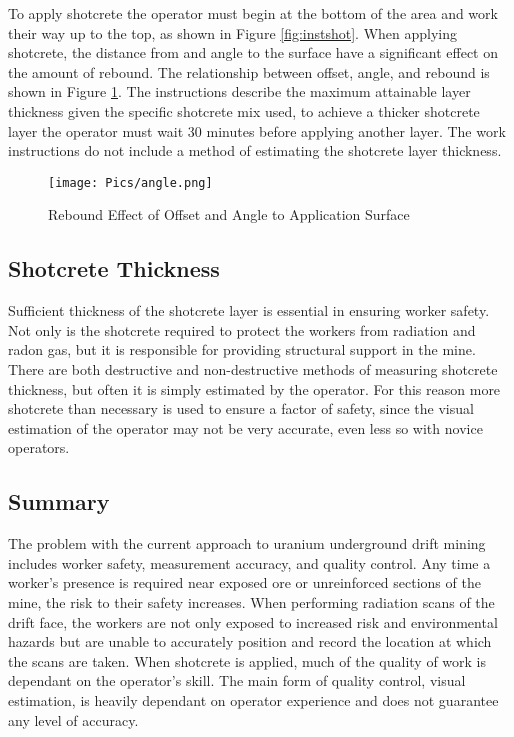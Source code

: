 To apply shotcrete the operator must begin at the bottom of the area and work their way up to the top, as shown in Figure \ref{fig:instshot}. When applying shotcrete, the distance from and angle to the surface have a significant effect on the amount of rebound. The relationship between offset, angle, and rebound is shown in Figure \ref{fig:rebound}. The instructions describe the maximum attainable layer thickness given the specific shotcrete mix used, to achieve a thicker shotcrete layer the operator must wait 30 minutes before applying another layer. The work instructions do not include a method of estimating the shotcrete layer thickness.\\

\begin{figure}
    \centering
    \texttt{[image: Pics/angle.png]}
    \caption{Rebound Effect of Offset and Angle to Application Surface \cite{camedoc}}
    \label{fig:rebound}
\end{figure}

\subsection{Shotcrete Thickness}

Sufficient thickness of the shotcrete layer is essential in ensuring worker safety. Not only is the shotcrete required to protect the workers from radiation and radon gas, but it is responsible for providing structural support in the mine. There are both destructive and non-destructive methods of measuring shotcrete thickness, but often it is simply estimated by the operator. For this reason more shotcrete than necessary is used to ensure a factor of safety, since the visual estimation of the operator may not be very accurate, even less so with novice operators.\\

\subsection{Summary}

The problem with the current approach to uranium underground drift mining includes worker safety, measurement accuracy, and quality control. Any time a worker's presence is required near exposed ore or unreinforced sections of the mine, the risk to their safety increases. When performing radiation scans of the drift face, the workers are not only exposed to increased risk and environmental hazards but are unable to accurately position and record the location at which the scans are taken. When shotcrete is applied, much of the quality of work is dependant on the operator's skill. The main form of quality control, visual estimation, is heavily dependant on operator experience and does not guarantee any level of accuracy.\\

